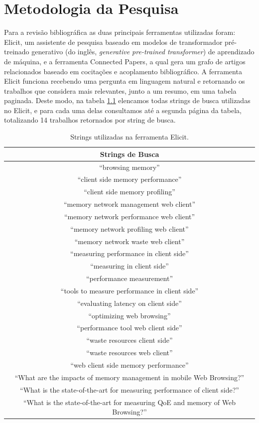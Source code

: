 \documentclass[12pt]{tcc}
\begin{document}
\chapter{Metodologia da Pesquisa}
\label{cap:met_pesquisa}

Para a revisão bibliográfica as duas principais ferramentas utilizadas foram: Elicit, um assistente de pesquisa baseado em modelos de transformador pré-treinado generativo (do inglês, \emph{generative pre-trained transformer}) de aprendizado de máquina, e a ferramenta Connected Papers, a qual  gera um grafo de artigos relacionados baseado em cocitações e acoplamento bibliográfico.
A ferramenta Elicit funciona recebendo uma pergunta em linguagem natural e retornando os trabalhos que considera mais relevantes, junto a um resumo, em uma tabela paginada.
Deste modo, na tabela \ref{tab:strings-elicit} elencamos todas strings de busca utilizadas no Elicit, e para cada uma delas consultamos até a segunda página da tabela, totalizando 14 trabalhos retornados por string de busca.

\begin{table}[h!]
\centering
\caption{Strings utilizadas na ferramenta Elicit.\label{long}}

\begin{tabular}{||c||} 
	
\hline
	Strings de Busca \\
\hline\hline
 ``browsing memory'' \\
 ``client side memory performance'' \\
 ``client side memory profiling'' \\
 ``memory network management web client'' \\
 ``memory network performance web client'' \\
 ``memory network profiling web client'' \\
 ``memory network waste web client'' \\
 ``measuring performance in client side'' \\
 ``measuring in client side'' \\
 ``performance measurement'' \\
 ``tools to measure performance in client side'' \\
 ``evaluating latency on client side'' \\
 ``optimizing web browsing'' \\
 ``performance tool web client side'' \\
 ``waste resources client side'' \\
 ``waste resources web client'' \\
 ``web client side memory performance'' \\
 ``What are the impacts of memory management in mobile Web Browsing?'' \\
 ``What is the state-of-the-art for measuring performance of client side?'' \\
 ``What is the state-of-the-art for measuring QoE and memory of Web Browsing?'' \\

 \hline
\end{tabular}
\label{tab:strings-elicit}
\end{table}
\end{document}

